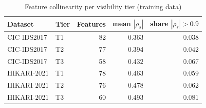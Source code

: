 \begin{table}[!htbp]
\centering
\caption{Feature collinearity per visibility tier (training data)}
\label{tab:collinearity}
\footnotesize
\setlength{\tabcolsep}{3.5pt}
\begin{tabular}{llrrr}
\toprule
\textbf{Dataset} & \textbf{Tier} & \textbf{Features} & \textbf{mean $|\rho_s|$} & \textbf{share $|\rho_s|>0.9$} \\
\midrule
CIC-IDS2017 & T1 & 82 & 0.363 & 0.038 \\
CIC-IDS2017 & T2 & 77 & 0.394 & 0.042 \\
CIC-IDS2017 & T3 & 58 & 0.432 & 0.067 \\
HIKARI-2021 & T1 & 78 & 0.463 & 0.059 \\
HIKARI-2021 & T2 & 76 & 0.478 & 0.062 \\
HIKARI-2021 & T3 & 60 & 0.493 & 0.081 \\
\bottomrule
\end{tabular}
\end{table}
